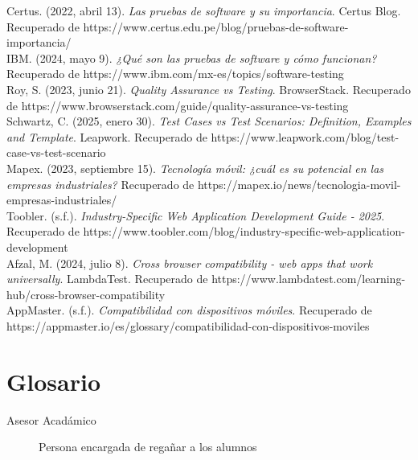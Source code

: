 \documentclass[12pt,letterpaper,spanish, xcolor=table]{report}
\begin{document}
	Certus. (2022, abril 13). \textit{Las pruebas de software y su importancia}. Certus Blog. Recuperado de {https://www.certus.edu.pe/blog/pruebas-de-software-importancia/}\\
	
	IBM. (2024, mayo 9). \textit{¿Qué son las pruebas de software y cómo funcionan?} Recuperado de {https://www.ibm.com/mx-es/topics/software-testing}\\
	
	Roy, S. (2023, junio 21). \textit{Quality Assurance vs Testing}. BrowserStack. Recuperado de {https://www.browserstack.com/guide/quality-assurance-vs-testing}\\
	
	Schwartz, C. (2025, enero 30). \textit{Test Cases vs Test Scenarios: Definition, Examples and Template}. Leapwork. Recuperado de {https://www.leapwork.com/blog/test-case-vs-test-scenario}\\
	
	Mapex. (2023, septiembre 15). \textit{Tecnología móvil: ¿cuál es su potencial en las empresas industriales?} Recuperado de {https://mapex.io/news/tecnologia-movil-empresas-industriales/}\\
	
	Toobler. (s.f.). \textit{Industry-Specific Web Application Development Guide - 2025}. Recuperado de {https://www.toobler.com/blog/industry-specific-web-application-development}\\
	
	Afzal, M. (2024, julio 8). \textit{Cross browser compatibility - web apps that work universally}. LambdaTest. Recuperado de {https://www.lambdatest.com/learning-hub/cross-browser-compatibility}\\
	
	AppMaster. (s.f.). \textit{Compatibilidad con dispositivos móviles}. Recuperado de {https://appmaster.io/es/glossary/compatibilidad-con-dispositivos-moviles}\\
	


\newpage	
\chapter{Glosario}

\begin{description}
	\item[Asesor Acadámico] Persona encargada de regañar a los alumnos
\end{description}
	
\end{document}
